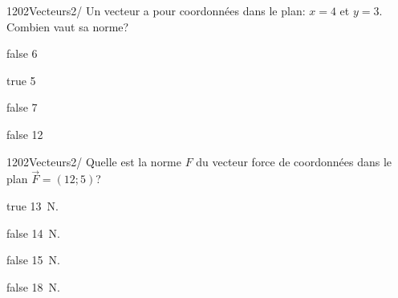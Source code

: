             \begin{question}{1202}{Vecteurs}{2}{/}
                Un vecteur a pour coordonnées dans le plan: $x = 4$ et $y = 3$. Combien vaut sa norme?
            \end{question}
            \begin{reponses}
                \item[false] 6
                \item[true] 5
                \item[false] 7
                \item[false] 12
            \end{reponses}
            \begin{question}{1202}{Vecteurs}{2}{/}
                Quelle est la norme $F$ du vecteur force de coordonnées dans le plan $\vec{F}=(12;5)$?
            \end{question}
            \begin{reponses}
                \item[true] \SI{13}{\newton}.
                \item[false] \SI{14}{\newton}.
                \item[false] \SI{15}{\newton}.
                \item[false] \SI{18}{\newton}.
            \end{reponses}
